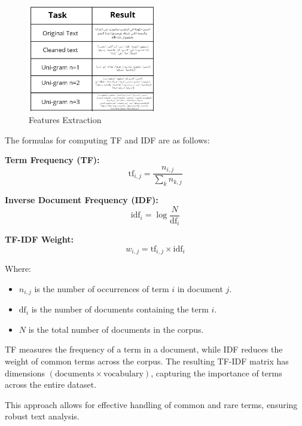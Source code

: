 \documentclass[a4paper,40pt,twocolumn]{article}
\begin{document}
\begin{figure}[h!]
    \hspace{0cm}
    \centering
    \includegraphics[width=0.5\textwidth]{text_man.png}
    \caption{Features Extraction}
    \label{fig:Features Extraction}
\end{figure}

The formulas for computing TF and IDF are as follows:

\textbf{Term Frequency (TF):}
\begin{equation}
\text{tf}_{i,j} = \frac{n_{i,j}}{\sum_k n_{k,j}}
\end{equation}

\textbf{Inverse Document Frequency (IDF):}
\begin{equation}
\text{idf}_i = \log{\frac{N}{\text{df}_i}}
\end{equation}

\textbf{TF-IDF Weight:}
\begin{equation}
w_{i,j} = \text{tf}_{i,j} \times \text{idf}_i
\end{equation}

Where:
\begin{itemize}
    \item $n_{i,j}$ is the number of occurrences of term $i$ in document $j$.
    \item $\text{df}_i$ is the number of documents containing the term $i$.
    \item $N$ is the total number of documents in the corpus.
\end{itemize}

TF measures the frequency of a term in a document, while IDF reduces the weight of common terms across the corpus. The resulting TF-IDF matrix has dimensions $(\text{documents} \times \text{vocabulary})$, capturing the importance of terms across the entire dataset.

This approach allows for effective handling of common and rare terms, ensuring robust text analysis.
\end{document}
